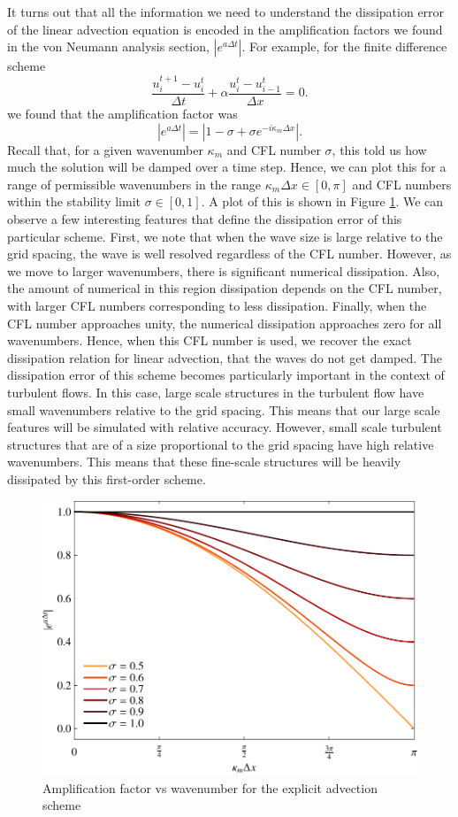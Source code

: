 It turns out that all the information we need to understand the dissipation error of the linear advection equation is encoded in the amplification factors we found in the von Neumann analysis section, $|e^{a\Delta t}|$. For example, for the finite difference scheme
\begin{equation}
	\frac{u_i^{t+1} - u_{i}^t}{\Delta t} +  \alpha \frac{u_i^t - u_{i-1}^t}{\Delta x} = 0.
\end{equation}
we found that the amplification factor was 
\begin{equation}
	|e^{a\Delta t}| = |1 - \sigma + \sigma e^{-i \kappa_m \Delta x}|.
\end{equation} 
Recall that, for a given wavenumber $\kappa_m$ and CFL number $\sigma$, this told us how much the solution will be damped over a time step. Hence, we can plot this for a range of permissible wavenumbers in the range $\kappa_m \Delta x \in [0,\pi]$ and CFL numbers within the stability limit $\sigma \in [0,1]$. A plot of this is shown in Figure \ref{fig:dissipation_advection_explicit}. We can observe a few interesting features that define the dissipation error of this particular scheme. First, we note that when the wave size is large relative to the grid spacing, the wave is well resolved regardless of the CFL number. However, as we move to larger wavenumbers, there is significant numerical dissipation. Also, the amount of numerical in this region dissipation depends on the CFL number, with larger CFL numbers corresponding to less dissipation. Finally, when the CFL number approaches unity, the numerical dissipation approaches zero for all wavenumbers. Hence, when this CFL number is used, we recover the exact dissipation relation for linear advection, that the waves do not get damped. The dissipation error of this scheme becomes particularly important in the context of turbulent flows. In this case, large scale structures in the turbulent flow have small wavenumbers relative to the grid spacing. This means that our large scale features will be simulated with relative accuracy. However, small scale turbulent structures that are of a size proportional to the grid spacing have high relative wavenumbers. This means that these fine-scale structures will be heavily dissipated by this first-order scheme.
\begin{figure}[htbp]
	\centering
	\includegraphics[width=0.6\linewidth]{Pictures/dissipation_adv_explct}
	\caption{Amplification factor vs wavenumber for the explicit advection scheme}
	\label{fig:dissipation_advection_explicit}
\end{figure}
